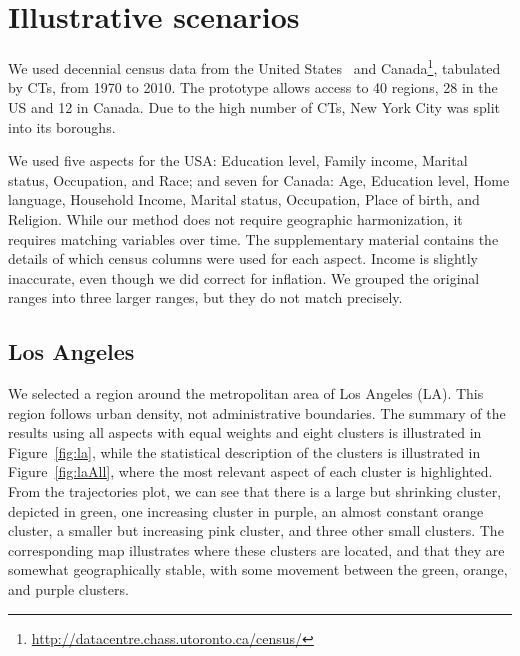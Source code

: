 \section{Illustrative scenarios}
\label{sec:study}

We used decennial census data from the United States~\cite{nhgis} and
Canada\footnote{\url{http://datacentre.chass.utoronto.ca/census/}}, tabulated by
CTs,  from 1970 to 2010. The prototype allows access to 40 regions, 28 in the US
and 12 in Canada. Due to the high number of CTs, New York City was split into
its boroughs. 


We used five aspects for the USA: Education level, Family income, Marital
status, Occupation, and Race; and seven for Canada: Age, Education level, Home
language, Household Income, Marital status, Occupation, Place of birth, and
Religion.  While our method does not require geographic harmonization, it
requires matching variables over time. The supplementary material contains the
details of which census columns were used for each aspect. Income is slightly
inaccurate, even though we did correct for inflation. We grouped the original ranges into
three larger ranges, but they do not match precisely.





\subsection{Los Angeles}
We selected a region around the metropolitan area of Los Angeles (LA). This
region follows urban density, not administrative boundaries. The summary of the
results using all aspects with equal weights and eight clusters is illustrated
in Figure~\ref{fig:la}, while the statistical description of the clusters is
illustrated in Figure~\ref{fig:laAll}, where the most relevant aspect of each
cluster is highlighted. From the trajectories plot, we can see that there is a
large but shrinking cluster, depicted in green, one increasing cluster in
purple, an almost constant orange cluster, a smaller but increasing pink
cluster, and three other small clusters. The corresponding map illustrates where
these clusters are located, and that they are somewhat geographically stable,
with some movement between the green, orange, and purple clusters.

